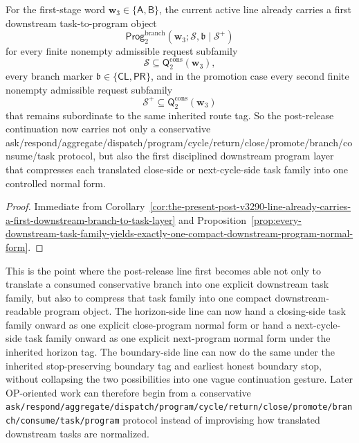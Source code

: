 \begin{corollary}
\label{cor:the-present-post-v3290-line-already-carries-a-first-downstream-task-to-program-layer}
For the first-stage word \(\mathbf w_3\in\{\mathsf A,\mathsf B\}\), the current active line already carries a first downstream task-to-program object
\[
 \mathsf{Prog}^{\mathrm{branch}}_{2}(\mathbf w_3;\mathcal S,\mathfrak b\mid\mathcal S^{+})
\]
for every finite nonempty admissible request subfamily
\[
 \mathcal S\subseteq \mathsf{Q}^{\mathrm{cons}}_{2}(\mathbf w_3),
\]
every branch marker \(\mathfrak b\in\{\mathsf{CL},\mathsf{PR}\}\), and in the promotion case every second finite nonempty admissible request subfamily
\[
 \mathcal S^{+}\subseteq \mathsf{Q}^{\mathrm{cons}}_{2}(\mathbf w_3)
\]
that remains subordinate to the same inherited route tag. So the post-release continuation now carries not only a conservative ask/respond/aggregate/dispatch/program/cycle/return/close/promote/branch/consume/task protocol, but also the first disciplined downstream program layer that compresses each translated close-side or next-cycle-side task family into one controlled normal form.
\end{corollary}

\begin{proof}
Immediate from Corollary~\ref{cor:the-present-post-v3290-line-already-carries-a-first-downstream-branch-to-task-layer} and Proposition~\ref{prop:every-downstream-task-family-yields-exactly-one-compact-downstream-program-normal-form}.
\end{proof}

\begin{remark}
\label{rem:what-the-first-downstream-task-to-program-layer-now-buys}
This is the point where the post-release line first becomes able not only to translate a consumed conservative branch into one explicit downstream task family, but also to compress that task family into one compact downstream-readable program object. The horizon-side line can now hand a closing-side task family onward as one explicit close-program normal form or hand a next-cycle-side task family onward as one explicit next-program normal form under the inherited horizon tag. The boundary-side line can now do the same under the inherited stop-preserving boundary tag and earliest honest boundary stop, without collapsing the two possibilities into one vague continuation gesture. Later OP-oriented work can therefore begin from a conservative {\nolinkurl{ask/respond/aggregate/dispatch/program/cycle/return/close/promote/branch/consume/task/program}} protocol instead of improvising how translated downstream tasks are normalized.
\end{remark}



